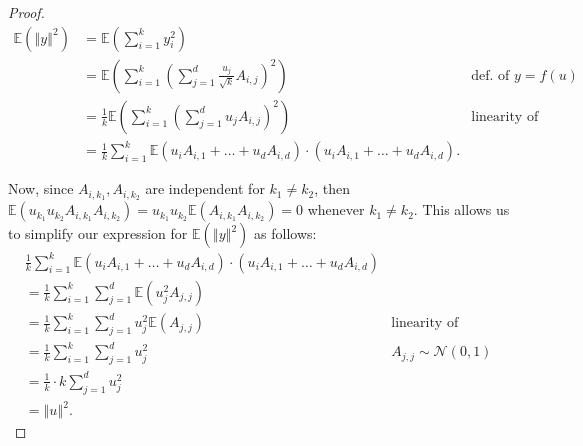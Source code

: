 \documentclass{article}
\begin{document}
     \begin{proof}
     \begin{align*}
         \mathbb{E}(\left\Vert y \right\Vert^2) &= \mathbb{E} \left(\sum_{i=1}^k y_i^2\right)\\
         &= \mathbb{E} \left(\sum_{i=1}^k \left( \sum_{j=1}^d \frac{u_j}{\sqrt{k}}A_{i,j} \right)^2\right) &\text{def. of $y = f(u)$}\\
         &= \frac{1}{k} \mathbb{E} \left(\sum_{i=1}^k \left( \sum_{j=1}^d u_j A_{i,j} \right)^2\right) &\text{linearity of expectation}\\
         &= \frac{1}{k} \sum_{i=1}^k \mathbb{E} (u_iA_{i,1} + \ldots + u_dA_{i,d}) \cdot (u_iA_{i,1} + \ldots + u_dA_{i,d}).
     \end{align*}
     
     Now, since $A_{i,k_1}, A_{i,k_2}$ are independent for $k_1 \neq k_2$, then $\mathbb{E}(u_{k_1}u_{k_2}A_{i,k_1}A_{i,k_2}) = u_{k_1}u_{k_2} \mathbb{E}(A_{i,k_1}A_{i,k_2}) = 0$ whenever $k_1 \neq k_2$. This allows us to simplify our expression for $\mathbb{E}(\left\Vert y \right\Vert^2)$ as follows:
     \begin{align*}
         &\frac{1}{k} \sum_{i=1}^k \mathbb{E} (u_iA_{i,1} + \ldots + u_dA_{i,d}) \cdot (u_iA_{i,1} + \ldots + u_dA_{i,d})\\
         &= \frac{1}{k} \sum_{i=1}^k \sum_{j=1}^d \mathbb{E}(u_j^2 A_{j,j})\\
         &= \frac{1}{k} \sum_{i=1}^k \sum_{j=1}^d u_j^2 \mathbb{E}(A_{j,j}) &\text{linearity of expectation}\\
         &= \frac{1}{k} \sum_{i=1}^k \sum_{j=1}^d u_j^2 &A_{j,j} \sim \mathcal{N}(0,1)\\
         &= \frac{1}{k} \cdot k \sum_{j=1}^d u_j^2\\
         &= \left\Vert u \right\Vert^2.
     \end{align*}
     \end{proof}
\end{document}

